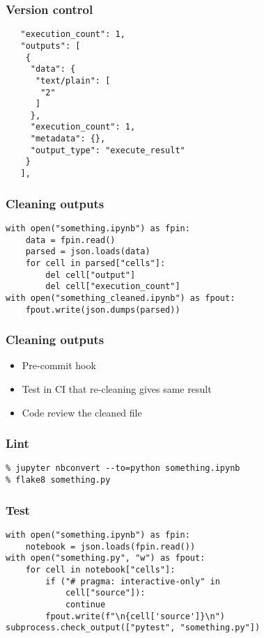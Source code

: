 \begin{frame}[fragile]
\frametitle{Version control}

\begin{lstlisting}
   "execution_count": 1,
   "outputs": [
    {
     "data": {
      "text/plain": [
       "2"
      ]
     },
     "execution_count": 1,
     "metadata": {},
     "output_type": "execute_result"
    }
   ],
\end{lstlisting}

\end{frame}

\begin{frame}[fragile]
\frametitle{Cleaning outputs}

\begin{lstlisting}
with open("something.ipynb") as fpin:
    data = fpin.read()
    parsed = json.loads(data)
    for cell in parsed["cells"]:
        del cell["output"]
        del cell["execution_count"]
with open("something_cleaned.ipynb") as fpout:
    fpout.write(json.dumps(parsed))
\end{lstlisting}

\end{frame}

\begin{frame}
\frametitle{Cleaning outputs}

\begin{itemize}
\item Pre-commit hook
\item Test in CI that re-cleaning gives same result
\item Code review the cleaned file
\end{itemize}

\end{frame}


\begin{frame}[fragile]

\frametitle{Lint}

\begin{lstlisting}
% jupyter nbconvert --to=python something.ipynb
% flake8 something.py
\end{lstlisting}

\end{frame}

\begin{frame}[fragile]
\frametitle{Test}

\begin{lstlisting}
with open("something.ipynb") as fpin:
    notebook = json.loads(fpin.read())
with open("something.py", "w") as fpout:
    for cell in notebook["cells"]:
        if ("# pragma: interactive-only" in
            cell["source"]):
            continue
        fpout.write(f"\n{cell['source']}\n")
subprocess.check_output(["pytest", "something.py"])
\end{lstlisting}

\end{frame}


